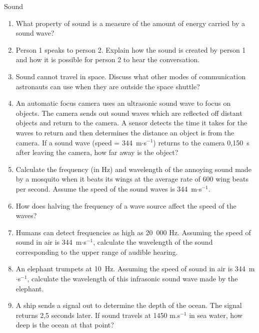 \begin{eocexercises}{Sound}
\begin{enumerate}[noitemsep, label=\textbf{\arabic*}. ]
\label{m38800*uid94}\item What property of sound is a measure of the amount of energy carried by a sound wave?\newline
\label{m38800*uid96}\item Person 1 speaks to person 2. Explain how the sound is created by person 1 and how it is possible for person 2 to hear the conversation.\newline
\label{m38800*uid97}\item Sound cannot travel in space. Discuss what other modes of communication astronauts can use when they are outside the space shuttle?\newline
\label{m38800*uid98}\item An automatic focus camera uses an ultrasonic sound wave to focus on objects. The camera sends out sound waves which are reflected off distant objects and return to the camera. A sensor detects the time it takes for the waves to return and then determines the distance an object is from the camera. If a sound wave (speed = 344~m$\ensuremath{\cdot}$s${}^{-1}$) returns to the camera 0,150~s after leaving the camera, how far away is the object?\newline
\label{m38800*uid99}\item Calculate the frequency (in Hz) and wavelength of the annoying sound made by a mosquito when it beats its wings at the average rate of 600 wing beats per second. Assume the speed of the sound waves is 344~m$\ensuremath{\cdot}$s${}^{-1}$.        
\label{m38800*uid100}\item How does halving the frequency of a wave source affect the speed of the waves?\newline
\label{m38800*uid101}\item Humans can detect frequencies as high as 20~000 Hz. Assuming the speed of sound in air is 344~m$\ensuremath{\cdot}$s${}^{-1}$, calculate the wavelength of the sound corresponding to the upper range of audible hearing.\newline
\label{m38800*uid102}\item An elephant trumpets at 10~Hz. Assuming the speed of sound in air is 344~m$\ensuremath{\cdot}$s${}^{-1}$, calculate the wavelength of this infrasonic sound wave made by the elephant.\newline
\label{m38800*uid103}\item A ship sends a signal out to determine the depth of the ocean. The signal returns 2,5 seconds later. If sound travels at
1450 m.s${}^{-1}$ in sea water, how deep is the ocean at that point?\newline

\end{enumerate}
\end{eocexercises}
